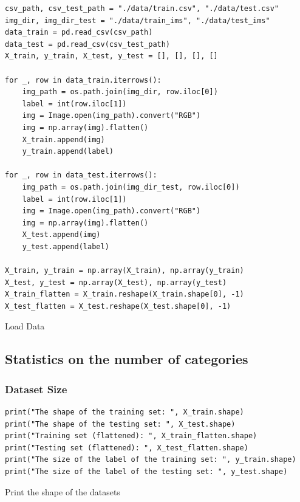 \documentclass[a4paper,11pt]{article}
\begin{document}
\begin{listing}[!ht]
\begin{verbatim}
csv_path, csv_test_path = "./data/train.csv", "./data/test.csv"
img_dir, img_dir_test = "./data/train_ims", "./data/test_ims"
data_train = pd.read_csv(csv_path)
data_test = pd.read_csv(csv_test_path)
X_train, y_train, X_test, y_test = [], [], [], []

for _, row in data_train.iterrows():
    img_path = os.path.join(img_dir, row.iloc[0])
    label = int(row.iloc[1])
    img = Image.open(img_path).convert("RGB")
    img = np.array(img).flatten()
    X_train.append(img)
    y_train.append(label)

for _, row in data_test.iterrows():
    img_path = os.path.join(img_dir_test, row.iloc[0])
    label = int(row.iloc[1])
    img = Image.open(img_path).convert("RGB")
    img = np.array(img).flatten()
    X_test.append(img)
    y_test.append(label)

X_train, y_train = np.array(X_train), np.array(y_train)
X_test, y_test = np.array(X_test), np.array(y_test)
X_train_flatten = X_train.reshape(X_train.shape[0], -1)
X_test_flatten = X_test.reshape(X_test.shape[0], -1)
\end{verbatim}
\caption{Load Data}
\label{listing:python}
\end{listing}

\subsection{Statistics on the number of categories}

\subsubsection{Dataset Size}

\begin{listing}[!ht]
\begin{verbatim}
print("The shape of the training set: ", X_train.shape)
print("The shape of the testing set: ", X_test.shape)
print("Training set (flattened): ", X_train_flatten.shape)
print("Testing set (flattened): ", X_test_flatten.shape)
print("The size of the label of the training set: ", y_train.shape)
print("The size of the label of the testing set: ", y_test.shape)
\end{verbatim}
\caption{Print the shape of the datasets}
\label{listing:python}
\end{listing}
\end{document}
